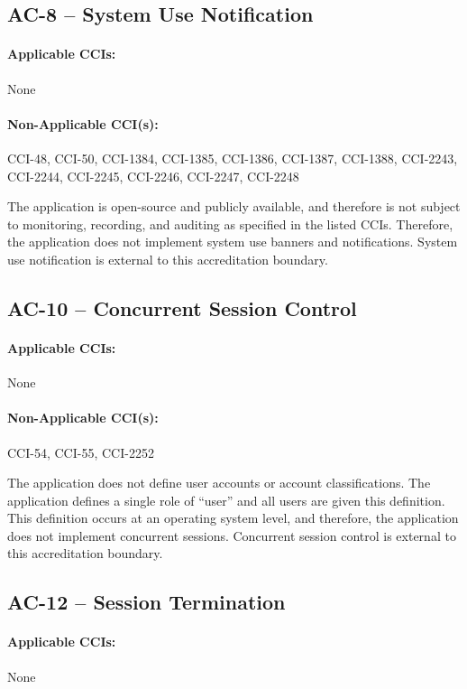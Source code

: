 \documentclass[letterpaper, 10pt, twoside]{article}
\begin{document}
\subsection{AC-8 -- System Use Notification}

\paragraph{Applicable CCIs:} None

\paragraph{Non-Applicable CCI(s):} CCI-48, CCI-50, CCI-1384, CCI-1385, CCI-1386, CCI-1387, CCI-1388, CCI-2243, CCI-2244, CCI-2245, CCI-2246, CCI-2247, CCI-2248

The application is open-source and publicly available, and therefore is not subject to monitoring, recording, and auditing as specified in the listed CCIs. Therefore, the application does not implement system use banners and notifications. System use notification is external to this accreditation boundary.

\subsection{AC-10 -- Concurrent Session Control}

\paragraph{Applicable CCIs:} None

\paragraph{Non-Applicable CCI(s):} CCI-54, CCI-55, CCI-2252

The application does not define user accounts or account classifications. The application defines a single role of “user” and all users are given this definition. This definition occurs at an operating system level, and therefore, the application does not implement concurrent sessions. Concurrent session control is external to this accreditation boundary.

\subsection{AC-12 -- Session Termination}
\label{sec:ac-12}

\paragraph{Applicable CCIs:} None
\end{document}
